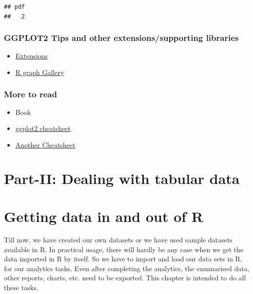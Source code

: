 \documentclass[
]{book}
\providecommand{\tightlist}{%
  \setlength{\itemsep}{0pt}\setlength{\parskip}{0pt}}
\begin{document}
\begin{verbatim}
## pdf 
##   2
\end{verbatim}

\hypertarget{ggplot2-tips-and-other-extensionssupporting-libraries}{%
\subsection{GGPLOT2 Tips and other extensions/supporting libraries}\label{ggplot2-tips-and-other-extensionssupporting-libraries}}

\begin{itemize}
\tightlist
\item
  \href{https://exts.ggplot2.tidyverse.org/gallery/}{Extensions}
\item
  \href{https://r-graph-gallery.com/ggplot2-package.html}{R graph Gallery}
\end{itemize}

\hypertarget{more-to-read}{%
\subsection{More to read}\label{more-to-read}}

\begin{itemize}
\tightlist
\item
  Book \citep{ggplot22016}
\item
  \href{https://posit.co/wp-content/uploads/2022/10/data-visualization-1.pdf}{ggplot2 cheatsheet}
\item
  \href{http://r-statistics.co/ggplot2-cheatsheet.html}{Another Cheatsheet}
\end{itemize}

\hypertarget{part-ii-dealing-with-tabular-data}{%
\chapter*{Part-II: Dealing with tabular data}\label{part-ii-dealing-with-tabular-data}}

\hypertarget{read}{%
\chapter{Getting data in and out of R}\label{read}}

Till now, we have created our own datasets or we have used sample datasets available in R. In practical usage, there will hardly be any case when we get the data imported in R by itself. So we have to import and load our data sets in R, for our analytics tasks. Even after completing the analytics, the summarised data, other reports, charts, etc. need to be exported. This chapter is intended to do all these tasks.
\end{document}
